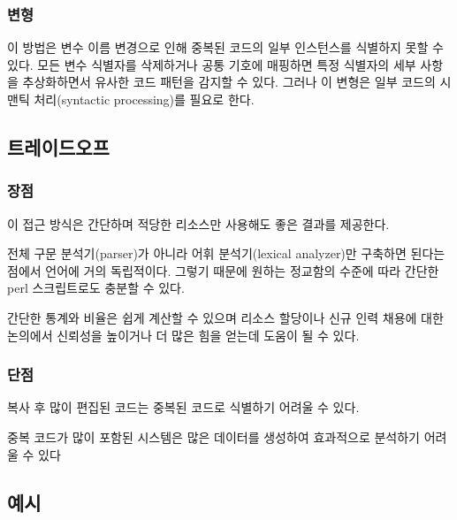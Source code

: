 \documentclass[a4paper,10pt,twoside]{book}
\begin{document}
\subsubsection*{변형}

이 방법은 변수 이름 변경으로 인해 중복된 코드의 일부 인스턴스를 식별하지 못할 수 있다. 모든 변수 식별자를 삭제하거나 공통 기호에 매핑하면 특정 식별자의 세부 사항을 추상화하면서 유사한 코드 패턴을 감지할 수 있다. 그러나 이 변형은 일부 코드의 시맨틱 처리(syntactic processing)를 필요로 한다. 

\subsection*{트레이드오프}

\subsubsection*{장점}

\begin{bulletlist}
\item 이 접근 방식은 간단하며 적당한 리소스만 사용해도 좋은 결과를 제공한다.

\item 전체 구문 분석기(parser)가 아니라 어휘 분석기(lexical analyzer)만 구축하면 된다는 점에서 언어에 거의 독립적이다. 그렇기 때문에 원하는 정교함의 수준에 따라 간단한 perl 스크립트로도 충분할 수 있다.

\item 간단한 통계와 비율은 쉽게 계산할 수 있으며 리소스 할당이나 신규 인력 채용에 대한 논의에서 신뢰성을 높이거나 더 많은 힘을 얻는데 도움이 될 수 있다.
\end{bulletlist}

\subsubsection*{단점}

\begin{bulletlist}
\item 복사 후 많이 편집된 코드는 중복된 코드로 식별하기 어려울 수 있다.

\item 중복 코드가 많이 포함된 시스템은 많은 데이터를 생성하여 효과적으로 분석하기 어려울 수 있다
\end{bulletlist}

\subsection*{예시}
\end{document}

